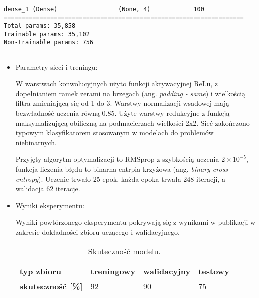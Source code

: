 {\newsavebox\myvvvvv
\begin{lrbox}{\myvvvvv}
\setlength{\myminipagewidth}{0.9\linewidth} %
\setlength{\myminipagecentering}{(\linewidth-\myminipagewidth)/2}
\noindent\hspace{\myminipagecentering}\begin{minipage}{\myminipagewidth}
\begin{verbatim}
___________________________________________________________________
dense_1 (Dense)                 (None, 4)            100    
===================================================================
Total params: 35,858
Trainable params: 35,102
Non-trainable params: 756
___________________________________________________________________
\end{verbatim} 
\end{minipage}\end{lrbox}
\resizebox{0.75\textwidth}{!}{\usebox\myvvvvv}

\begin{itemize}
\item Parametry sieci i treningu:

W warstwach konwolucyjnych użyto funkcji aktywacyjnej ReLu, z dopełnianiem ramek zerami na brzegach (ang. \textit{padding - same}) i wielkością filtra zmieniającą się od 1 do 3. Warstwy normalizacji wsadowej mają bezwładność uczenia równą 0.85. Użyte warstwy redukcyjne z funkcją maksymalizującą obiliczną na podmacierzach wielkości 2x2. Sieć zakończono typowym klasyfikatorem stosowanym w modelach do problemów niebinarnych. 

Przyjęty algorytm optymalizacji to RMSprop z szybkością uczenia \(2 \times 10^{-5}\), funkcja liczenia błędu to binarna entrpia krzyżowa (ang. \textit{binary cross entropy}). Uczenie trwało 25 epok, każda epoka trwała 248 iteracji, a walidacja 62 iteracje.
\item Wyniki eksperymentu:

Wyniki powtórzonego eksperymentu pokrywają się z wynikami w publikacji w zakresie dokładności zbioru uczącego i walidacyjnego.

\begin{table}[h]
\centering
\caption[Short Heading]{Skuteczność modelu.}
\begin{tabular}{|l|l|l|l|}
\hline
\textbf{typ zbioru}           & \textbf{treningowy} & \textbf{walidacyjny} & \textbf{testowy} \\ \hline
\textbf{skuteczność {[}\%{]}} & 92                  & 90                   & 75               \\ \hline
\end{tabular}
\end{table}

\end{itemize}
}

